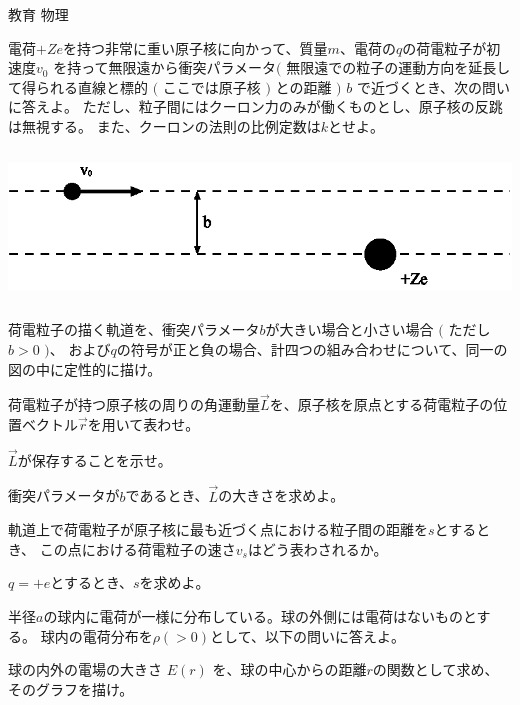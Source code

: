 \documentclass[fleqn]{jbook}
\begin{document}
\begin{question}{教育 物理}{}

\begin{subquestions}
\SubQuestion
電荷$+Ze$を持つ非常に重い原子核に向かって、質量$m$、電荷の$q$の荷電粒子が初速度$v_0$
を持って無限遠から衝突パラメータ$($ 無限遠での粒子の運動方向を延長して得られる直線と標的
$($ ここでは原子核 $)$ との距離 $)$ $b$ で近づくとき、次の問いに答えよ。
ただし、粒子間にはクーロン力のみが働くものとし、原子核の反跳は無視する。
また、クーロンの法則の比例定数は$k$とせよ。\\
\begin{center}
\includegraphics[clip,height=4cm]{1998phys1-1.eps}
\end{center}


\begin{subsubquestions}
\SubSubQuestion
 荷電粒子の描く軌道を、衝突パラメータ$b$が大きい場合と小さい場合 $($ ただし$b>0$ $)$、
 および$q$の符号が正と負の場合、計四つの組み合わせについて、同一の図の中に定性的に描け。

\SubSubQuestion
荷電粒子が持つ原子核の周りの角運動量$\vec{L}$を、原子核を原点とする荷電粒子の位置ベクトル$\vec{r}$を用いて表わせ。

\SubSubQuestion
$\vec{L}$が保存することを示せ。

\SubSubQuestion
衝突パラメータが$b$であるとき、$\vec{L}$の大きさを求めよ。

\SubSubQuestion
軌道上で荷電粒子が原子核に最も近づく点における粒子間の距離を$s$とするとき、
この点における荷電粒子の速さ$v_{s}$はどう表わされるか。

\SubSubQuestion
$q=+e$とするとき、$s$を求めよ。

\end{subsubquestions}


\SubQuestion
半径$a$の球内に電荷が一様に分布している。球の外側には電荷はないものとする。
球内の電荷分布を$\rho ( >0 )$として、以下の問いに答えよ。
\begin{subsubquestions}
\SubSubQuestion
球の内外の電場の大きさ $E(r)$ を、球の中心からの距離$r$の関数として求め、そのグラフを描け。


\end{subsubquestions}
\end{subquestions}
\end{question}
\end{document}
